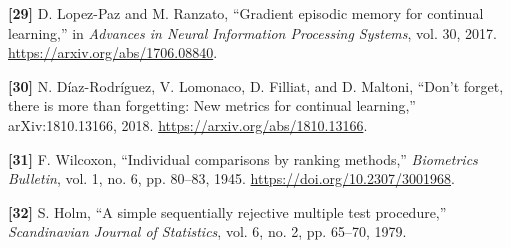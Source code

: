 \documentclass[10pt,a4paper]{article}
\begin{document}
\par\noindent\textbf{[29]}  D. Lopez-Paz and M. Ranzato, ``Gradient episodic memory for continual learning,'' in \emph{Advances in Neural Information Processing Systems}, vol. 30, 2017. \url{https://arxiv.org/abs/1706.08840}.


\par\noindent\textbf{[30]}  N. D\'iaz-Rodr\'iguez, V. Lomonaco, D. Filliat, and D. Maltoni, ``Don't forget, there is more than forgetting: New metrics for continual learning,'' arXiv:1810.13166, 2018. \url{https://arxiv.org/abs/1810.13166}.

\par\noindent\textbf{[31]}  F. Wilcoxon, ``Individual comparisons by ranking methods,'' \emph{Biometrics Bulletin}, vol. 1, no. 6, pp. 80--83, 1945. \url{https://doi.org/10.2307/3001968}.

\par\noindent\textbf{[32]}  S. Holm, ``A simple sequentially rejective multiple test procedure,'' \emph{Scandinavian Journal of Statistics}, vol. 6, no. 2, pp. 65--70, 1979.
\end{document}
